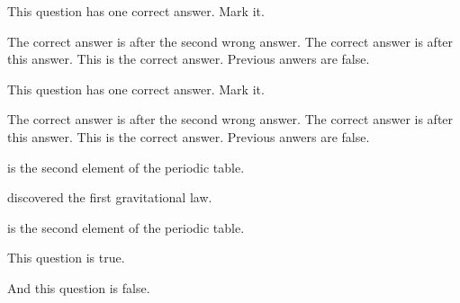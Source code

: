 \documentclass{exam}
\newcommand{\tf}[1][{}]{%
   \fillin[#1][0.25in]%
}
\begin{document}
\begin{questions}
\begin{minipage}{\linewidth}
\end{minipage}

\begin{minipage}{\linewidth}

\question This question has one correct answer. Mark it.

  \begin{checkboxes}
    \choice The correct answer is after the second wrong answer.
    \choice The correct answer is after this answer.
    \choice This is the correct answer.
    \CorrectChoice Previous anwers are false.
   \end{checkboxes}
   \printanswers

\end{minipage}

\begin{minipage}{\linewidth}

   \question This question has one correct answer. Mark it.

   \begin{checkboxes}
     \choice The correct answer is after the second wrong answer.
     \choice The correct answer is after this answer.
     \choice This is the correct answer.
     \CorrectChoice Previous anwers are false.
   \end{checkboxes}
\end{minipage}



 \setcounter{question}{0}


\begin{minipage}{\linewidth}

  \question \fillin[Helium] is the second element of the periodic table.

\end{minipage}

\begin{minipage}{\linewidth}

  \question {} discovered the first gravitational law.
  \printanswers

  \end{minipage}

\begin{minipage}{\linewidth}

  \question \fillin[Helium] is the second element of the periodic table.

  \end{minipage}

\begin{minipage}{\linewidth}

  \question \tf[T] This question is true.

\end{minipage}

\begin{minipage}{\linewidth}

  \question \tf[F] And this question is false.
  \printanswers
\end{minipage}


\end{questions}
\end{document}
